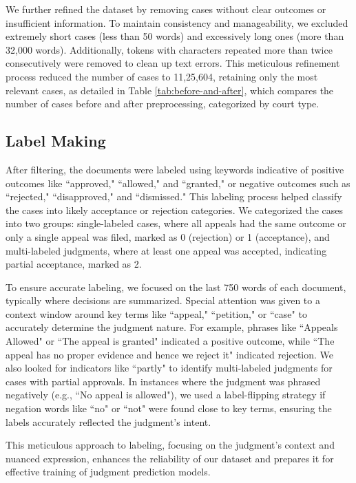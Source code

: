 We further refined the dataset by removing cases without clear outcomes or insufficient information. To maintain consistency and manageability, we excluded extremely short cases (less than 50 words) and excessively long ones (more than 32,000 words). Additionally, tokens with characters repeated more than twice consecutively were removed to clean up text errors. This meticulous refinement process reduced the number of cases to 11,25,604, retaining only the most relevant cases, as detailed in Table \ref{tab:before-and-after}, which compares the number of cases before and after preprocessing, categorized by court type.

\subsection{Label Making}
After filtering, the documents were labeled using keywords indicative of positive outcomes like ``approved," ``allowed," and ``granted," or negative outcomes such as ``rejected," ``disapproved," and ``dismissed." This labeling process helped classify the cases into likely acceptance or rejection categories. We categorized the cases into two groups: single-labeled cases, where all appeals had the same outcome or only a single appeal was filed, marked as 0 (rejection) or 1 (acceptance), and multi-labeled judgments, where at least one appeal was accepted, indicating partial acceptance, marked as 2.

To ensure accurate labeling, we focused on the last 750 words of each document, typically where decisions are summarized. Special attention was given to a context window around key terms like ``appeal," ``petition," or ``case" to accurately determine the judgment nature. For example, phrases like ``Appeals Allowed" or ``The appeal is granted" indicated a positive outcome, while ``The appeal has no proper evidence and hence we reject it" indicated rejection. We also looked for indicators like ``partly" to identify multi-labeled judgments for cases with partial approvals. In instances where the judgment was phrased negatively (e.g., ``No appeal is allowed"), we used a label-flipping strategy if negation words like ``no" or ``not" were found close to key terms, ensuring the labels accurately reflected the judgment's intent.

This meticulous approach to labeling, focusing on the judgment's context and nuanced expression, enhances the reliability of our dataset and prepares it for effective training of judgment prediction models.

